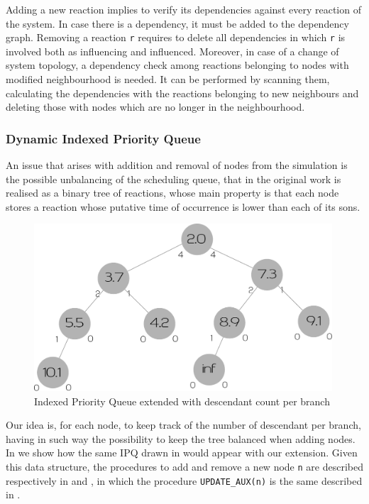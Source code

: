 \documentclass[12pt,a4paper,twoside,openright]{book}
\begin{document}
Adding a new reaction implies to verify its dependencies against every reaction of the system. In case there is a dependency, it must be added to the dependency graph. 
Removing a reaction \texttt{r} requires to delete all dependencies in which \texttt{r} is involved both as influencing and influenced.
Moreover, in case of a change of system topology, a dependency check among reactions belonging to nodes with modified neighbourhood is needed. It can be performed by scanning them, calculating the dependencies with the reactions belonging to new neighbours and deleting those with nodes which are no longer in the neighbourhood.

\subsubsection{Dynamic Indexed Priority Queue}

An issue that arises with addition and removal of nodes from the simulation is the possible unbalancing of the scheduling queue, that in the original work is realised as a binary tree of reactions, whose main property is that each node stores a reaction whose putative time of occurrence is lower than each of its sons.

\begin{figure}%
  \begin{center}
    \includegraphics[width=0.99\textwidth]{img/extipq.pdf}
    \caption{Indexed Priority Queue extended with descendant count per branch}
    \label{img:ipq}
  \end{center}
\end{figure}

Our idea is, for each node, to keep track of the number of descendant per branch, having in such way the possibility to keep the tree balanced when adding nodes. In  we show how the same IPQ drawn in \cite{gibson2000} would appear with our extension. Given this data structure, the procedures to add and remove a new node \texttt{n} are described respectively in  and , in which the procedure \texttt{UPDATE\_AUX(n)} is the same described in \cite{gibson2000}.
\end{document}
